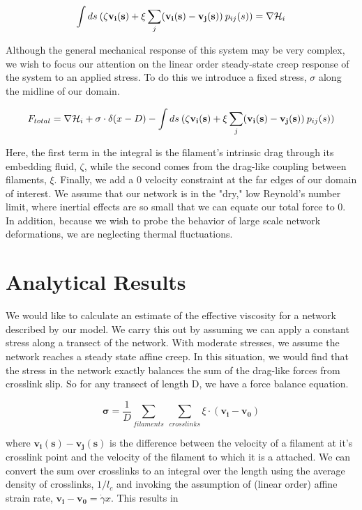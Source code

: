 \documentclass[prb,11pt]{revtex4-1}
\begin{document}
\begin{equation}
\int ds \: (\mathbf{\zeta v_i(s)} + \xi \sum _j(\mathbf{v_i(s)}-\mathbf{v_j(s)}) \: p_{ij}(s))= \nabla {\cal H}_i
\end{equation}

Although the general mechanical response of this system may be very complex, we wish to focus our attention on the linear order steady-state creep response of the system to an applied stress.  To do this we introduce a fixed stress, $\sigma$ along the midline of our domain.

\begin{equation}
F_{total}= \nabla {\cal H}_i + \sigma\cdot\delta(x-D)- \int ds \: (\zeta\mathbf{v_i(s)} + \xi \sum _j(\mathbf{v_i(s)}-\mathbf{v_j(s)}) \: p_{ij}(s)) 
\end{equation}

Here, the first term in the integral is the filament's intrinsic drag through its embedding fluid, $\zeta$, while the second comes from the drag-like coupling between filaments, $\xi$.  Finally, we add a 0 velocity constraint at the far edges of our domain of interest.  We assume that our network is in the "dry," low Reynold's number limit, where inertial effects are so small that we can equate our total force to 0.  In addition, because we wish to probe the behavior of large scale network deformations, we are neglecting thermal fluctuations.  

\section{Analytical Results}
We would like to calculate an estimate of the effective viscosity for a network described by our model.  We carry this out by assuming we can apply a constant stress along a transect of the network.  With moderate stresses, we assume the network reaches a steady state affine creep. In this situation, we would find that the stress in the network exactly balances the sum of the drag-like forces from crosslink slip.  So for any transect of length D, we have a force balance equation.

\begin{equation}
\mathbf{\sigma} = \frac{1}{D}\sum_{filaments}\: \sum_{crosslinks}\xi \cdot (\mathbf{v_i}-\mathbf{v_0})
\end{equation}

where $\mathbf{v_i(s)}-\mathbf{v_j(s)}$ is the difference between the velocity of a filament at it's crosslink point and the velocity of the filament to which it is a attached. We can convert the sum over crosslinks to an integral over the length using the average density of crosslinks, $1/l_c$ and invoking the assumption of (linear order) affine strain rate, $\mathbf{v_i}-\mathbf{v_0}=\dot \gamma x$. This results in
\end{document}
